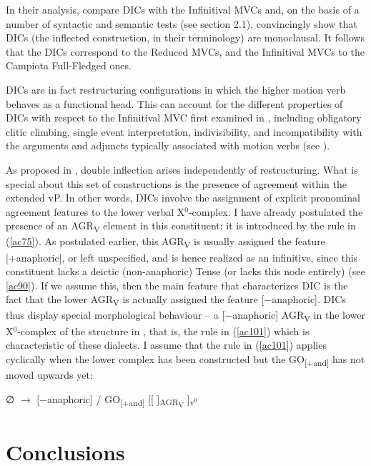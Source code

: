 \documentclass[output=paper]{langscibook}
\begin{document}
In their analysis, \citet{cardinaletti2001a} compare DICs with the Infinitival MVCs and, on the basis of a number of syntactic and semantic tests (see section 2.1), convincingly show that DICs (the inflected construction, in their terminology) are monoclausal. It follows that the DICs correspond to the Reduced MVCs, and the Infinitival MVCs to the Campiota Full-Fledged ones.

DICs are in fact restructuring configurations in which the higher motion verb behaves as a functional head. This can account for the different properties of DICs with respect to the Infinitival MVC first examined in \citet{cardinaletti2001a}, including obligatory clitic climbing, single event interpretation, indivisibility, and incompatibility with the arguments and adjuncts typically associated with motion verbs (see \citealt{cardinaletti2001a, cardinaletti2003a, manzini2005a, cruschina2013a, caro2019a}).

As proposed in \citet{cruschina2021a}, double inflection arises independently of restructuring. What is special about this set of constructions is the presence of agreement within the extended vP. In other words, DICs involve the assignment of explicit pronominal agreement features to the lower verbal X$^0$-complex. I have already postulated the presence of an  AGR\textsubscript{V} element in this constituent: it is introduced by the rule in (\ref{ac75}).  As postulated earlier, this AGR\textsubscript{V} is usually assigned the feature [+anaphoric], or left unspecified, and is hence realized as an infinitive, since this constituent lacks a deictic (non-anaphoric) Tense (or lacks this node entirely) (see \ref{ac90}). If we assume this, then the main feature that characterizes DIC is the fact that the lower AGR\textsubscript{V} is actually assigned the feature [−anaphoric]. DICs thus display special morphological behaviour  --  a \mbox{[−anaphoric]} AGR\textsubscript{V} in the lower X$^0$-complex of the structure in , that is, the rule in (\ref{ac101}) which is characteristic of these dialects. I assume that the rule in (\ref{ac101}) applies cyclically when the lower complex has been constructed but the GO\textsubscript{[+and]} has not moved upwards yet:

\ea \label{ac101}∅ $\rightarrow$ [−anaphoric] /  GO\textsubscript{[+and]} [[ \underline{\hspace{3em}} ]\textsubscript{AGR\textsubscript{V}} ]\textsubscript{v$^0$}
\z

\section{Conclusions}
\end{document}
